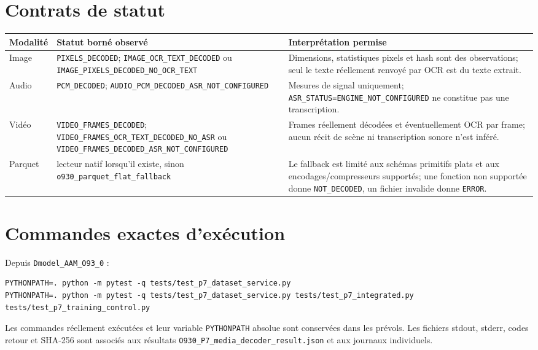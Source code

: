 \documentclass[11pt,a4paper]{report}
\begin{document}
\section{Contrats de statut}
\small
\begin{longtable}{>{\raggedright\arraybackslash}p{.17\linewidth}>{\raggedright\arraybackslash}p{.32\linewidth}>{\raggedright\arraybackslash}p{.38\linewidth}}\toprule Modalité & Statut borné observé & Interprétation permise \\\midrule
Image & \texttt{PIXELS\_DECODED}; \texttt{IMAGE\_OCR\_\allowbreak{}TEXT\_\allowbreak{}DECODED} ou \texttt{IMAGE\_PIXELS\_\allowbreak{}DECODED\_\allowbreak{}NO\_\allowbreak{}OCR\_\allowbreak{}TEXT} & Dimensions, statistiques pixels et hash sont des observations; seul le texte réellement renvoyé par OCR est du texte extrait. \\
Audio & \texttt{PCM\_DECODED}; \texttt{AUDIO\_PCM\_\allowbreak{}DECODED\_\allowbreak{}ASR\_\allowbreak{}NOT\_\allowbreak{}CONFIGURED} & Mesures de signal uniquement; \texttt{ASR\_STATUS=ENGINE\_\allowbreak{}NOT\_\allowbreak{}CONFIGURED} ne constitue pas une transcription. \\
Vidéo & \texttt{VIDEO\_FRAMES\_DECODED}; \texttt{VIDEO\_FRAMES\_\allowbreak{}OCR\_\allowbreak{}TEXT\_\allowbreak{}DECODED\_\allowbreak{}NO\_\allowbreak{}ASR} ou \texttt{VIDEO\_FRAMES\_\allowbreak{}DECODED\_\allowbreak{}ASR\_\allowbreak{}NOT\_\allowbreak{}CONFIGURED} & Frames réellement décodées et éventuellement OCR par frame; aucun récit de scène ni transcription sonore n'est inféré. \\
Parquet & lecteur natif lorsqu'il existe, sinon \texttt{o930\_parquet\_flat\_fallback} & Le fallback est limité aux schémas primitifs plats et aux encodages/compresseurs supportés; une fonction non supportée donne \texttt{NOT\_DECODED}, un fichier invalide donne \texttt{ERROR}. \\
\bottomrule\end{longtable}
\section{Commandes exactes d'exécution}
Depuis \texttt{Dmodel\_AAM\_O93\_0} :
\begin{lstlisting}
PYTHONPATH=. python -m pytest -q tests/test_p7_dataset_service.py
PYTHONPATH=. python -m pytest -q tests/test_p7_dataset_service.py tests/test_p7_integrated.py tests/test_p7_training_control.py
\end{lstlisting}
Les commandes réellement exécutées et leur variable \texttt{PYTHONPATH} absolue sont conservées dans les prévols. Les fichiers stdout, stderr, codes retour et SHA-256 sont associés aux résultats \texttt{O930\_P7\_media\_decoder\_result.json} et aux journaux individuels.
\end{document}
